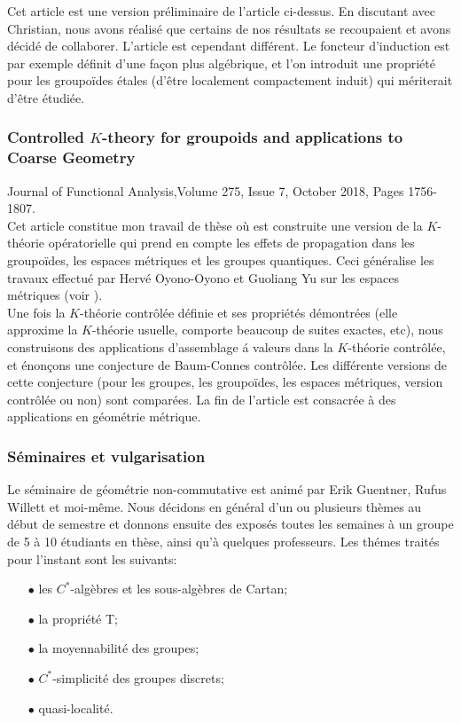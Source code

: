 \documentclass[a4paper,11pt]{article}
\begin{document}
Cet article est une version pr\'eliminaire de l'article ci-dessus. En discutant avec Christian, nous avons r\'ealis\'e que certains de nos r\'esultats se recoupaient et avons d\'ecid\'e de collaborer. L'article est cependant diff\'erent. Le foncteur d'induction est par exemple d\'efinit d'une fa\c{c}on plus alg\'ebrique, et l'on introduit une propri\'et\'e pour les groupo\"ides \'etales (d'\^etre localement compactement induit) qui m\'eriterait d'\^etre \'etudi\'ee.

\subsubsection*{Controlled $K$-theory for groupoids and applications to Coarse Geometry} 

Journal of Functional Analysis,Volume 275, Issue 7, October 2018, Pages 1756-1807.\\	 

Cet article constitue mon travail de th\`ese o\`u est construite une version de la $K$-th\'eorie op\'eratorielle qui prend en compte les effets de propagation dans les groupo\"ides, les espaces m\'etriques et les groupes quantiques. Ceci g\'en\'eralise les travaux effectu\'e par Herv\'e Oyono-Oyono et Guoliang Yu sur les espaces m\'etriques (voir \cite{OY1}\cite{OY2}\cite{OY3}\cite{oyono2019quantitative}). \\

Une fois la $K$-th\'eorie contr\^ol\'ee d\'efinie et ses propri\'et\'es d\'emontr\'ees (elle approxime la $K$-th\'eorie usuelle, comporte beaucoup de suites exactes, etc), nous construisons des applications d'assemblage \'a valeurs dans la $K$-th\'eorie contr\^ol\'ee, et \'enon\c{c}ons une conjecture de Baum-Connes contr\^ol\'ee. Les diff\'erente versions de cette conjecture (pour les groupes, les groupo\"ides, les espaces m\'etriques, version contr\^ol\'ee ou non) sont compar\'ees. La fin de l'article est consacr\'ee \`a des applications en g\'eom\'etrie m\'etrique.  

\subsubsection*{S\'eminaires et vulgarisation}

Le s\'eminaire de g\'eom\'etrie non-commutative est anim\'e par Erik Guentner, Rufus Willett et moi-m\^eme. Nous d\'ecidons en g\'en\'eral d'un ou plusieurs th\`emes au d\'ebut de semestre et donnons ensuite des expos\'es toutes les semaines \`a un groupe de 5 \`a 10 \'etudiants en th\`ese, ainsi qu'\`a quelques professeurs. Les th\'emes trait\'es pour l'instant sont les suivants:
\begin{itemize}
\item[$\bullet$] les $C^*$-alg\`ebres et les sous-alg\`ebres de Cartan;
\item[$\bullet$] la propri\'et\'e T;
\item[$\bullet$] la moyennabilit\'e des groupes;
\item[$\bullet$] $C^*$-simplicit\'e des groupes discrets;
\item[$\bullet$] quasi-localit\'e.
\end{itemize}
\end{document}
